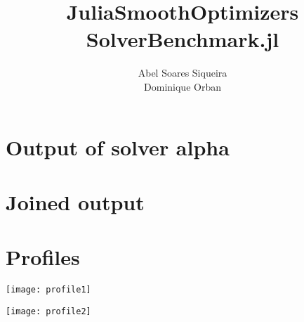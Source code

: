 \documentclass[12pt]{article}
\title{
	JuliaSmoothOptimizers \\ SolverBenchmark.jl
}
\author{
	Abel Soares Siqueira \\ Dominique Orban
}
\date{ }
\begin{document}
\maketitle

\section*{Output of solver alpha}



\section*{Joined output}



\section*{Profiles}

\begin{center}
  \texttt{[image: profile1]}

  \texttt{[image: profile2]}
\end{center}
\end{document}
